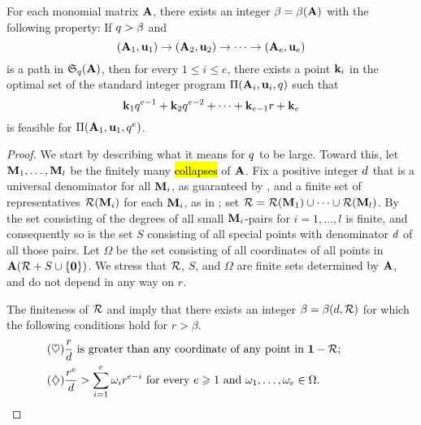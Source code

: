 \documentclass{amsart}
\begin{document}

\begin{theorem}
\label{ILL: T}
   For each monomial matrix $\mathbf{A}$, there exists an integer $\beta = \beta(\mathbf{A})$ with the following property\textup:
   If $q>\beta$ and \[ (\mathbf{A}_1, \mathbf{u}_1) \to (\mathbf{A}_2, \mathbf{u}_2) \to \cdots \to (\mathbf{A}_e, \mathbf{u}_e)\] is a path in $\mathfrak{S}_{q}(\mathbf{A})$, then for every $1 \leq i \leq e$, there exists a point $\mathbf{k}_i$ in the optimal set of the standard integer program $\Pi(\mathbf{A}_i, \mathbf{u}_i, q)$  such that
   \[
      \mathbf{k}_1 q^{e-1} + \mathbf{k}_2 q^{e-2} + \cdots + \mathbf{k}_{e-1} r + \mathbf{k}_e
   \]
   is feasible for $\Pi(\mathbf{A}_1, \mathbf{u}_1, q^e)$.
 \end{theorem}

\begin{proof}
   We start by describing what it means for $q$ to be large.
   Toward this, let $\mathbf{M}_1, \ldots, \mathbf{M}_l$ be the finitely many \hl{collapses} of  $\mathbf{A}$.
   Fix a positive integer $d$ that is a universal denominator for all $\mathbf{M}_i$, as guaranteed by , and a finite set of representatives $\mathcal{R}(\mathbf{M}_i)$ for each $\mathbf{M}_i$, as in ; set $\mathcal{R} = \mathcal{R}(\mathbf{M}_1) \cup \cdots \cup \mathcal{R}(\mathbf{M}_l)$.
   By  the set consisting of the degrees of all small $\mathbf{M}_i$-pairs for $i=1,\ldots,l$ is finite, and consequently so is the set $S$ consisting of all special points with denominator $d$ of all those pairs.
   Let $\Omega$ be the set consisting of all coordinates of all points in $\mathbf{A}(\mathcal{R}+S\cup\{\mathbf{0}\})$.
   We stress that $\mathcal{R}$, $S$, and $\Omega$ are finite sets determined by $\mathbf{A}$, and do not depend in any way on $r$.

   The finiteness of $\mathcal{R}$  and 
   imply that there exists an integer $\beta = \beta(d, \mathcal{R})$ for which the following conditions hold for $r > \beta$.
    \begin{align}
      \tag{$\heartsuit$} \label{r-big-1}
      &\text{$\frac{r}{d}$ is greater than any coordinate of any point in $\mathbf{1} - \mathcal{R}$;}\qquad\qquad\quad \\
      \tag{$\diamondsuit$} \label{r-big-2}
      &\text{$\frac{r^e}{d} > \sum_{i=1}^e \omega_i r^{e-i}$ for every $e \geqslant 1$ and $\omega_1, \ldots, \omega_e \in \Omega$.}
    \end{align}


\end{proof}
\end{document}

